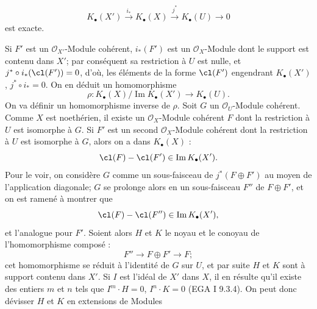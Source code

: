 \[
K_\bullet(X')\xrightarrow{i_*}K_\bullet(X)\xrightarrow{j^*}K_\bullet(U)\longrightarrow 0
\]
est
exacte.

Si $F'$ est un $\mathcal O_{X'}$-Module cohérent, $i_*(F')$ est un $\mathcal O_X$-Module dont le support est contenu dans $X'$; par conséquent sa restriction à $U$ est nulle, et $j^*\circ i_*(\cl(F'))=0$, d'où, les éléments de la forme $\cl(F')$ engendrant $K_\bullet(X')$, $j^*\circ i_*=0$. On en déduit un homomorphisme
\[
 \rho:K_\bullet(X)/\operatorname{Im}K_\bullet(X')\longrightarrow K_\bullet(U).
\]
On va définir un homomorphisme inverse de $\rho$. Soit $G$ un $\mathcal O_U$-Module cohérent. Comme $X$ est noethérien, il existe un $\mathcal O_X$-Module cohérent $F$ dont la restriction à $U$ est isomorphe à $G$. Si $F'$ est un second $\mathcal O_X$-Module cohérent dont la restriction à $U$ est isomorphe à $G$, alors on a dans $K_\bullet(X)$ :
\[
 \cl(F)-\cl(F')\in \operatorname{Im}K_\bullet(X').
\]
Pour le voir, on considère $G$ comme un sous-faisceau de $j^*(F\oplus F')$ au moyen de l'application diagonale; $G$ se prolonge alors en un sous-faisceau $F''$ de $F\oplus F'$, et on est ramené à montrer que
\[
 \cl(F)-\cl(F'')\in \operatorname{Im}K_\bullet(X'),
\]
et l'analogue pour $F'$. Soient alors $H$ et $K$ le noyau et le conoyau de l'homomorphisme composé :
\[
F''\longrightarrow F\oplus F'\longrightarrow F ;
\]
cet homomorphisme se réduit à l'identité de $G$ sur $U$, et par suite $H$ et $K$ sont à support contenu dans $X'$. Si $I$ est l'idéal de $X'$ dans $X$, il en résulte qu'il existe des entiers $m$ et $n$ tels que $I^m\cdot H=0$, $I^n\cdot K=0$ (EGA I 9.3.4). On peut donc dévisser $H$ et $K$ en extensions de Modules
